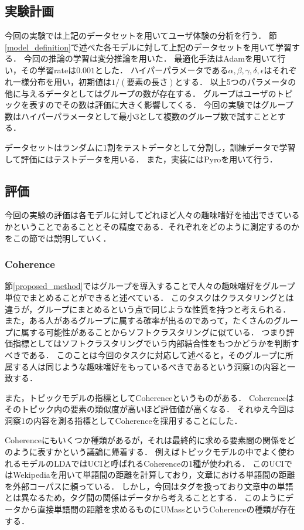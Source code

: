 \documentclass[a4j,10pt, twocolumn]{jarticle}
\begin{document}
\subsection{実験計画} \label{experimental-setting}
今回の実験では上記のデータセットを用いてユーザ体験の分析を行う．
節\ref{model_definition}で述べた各モデルに対して上記のデータセットを用いて学習する．
今回の推論の学習は変分推論を用いた．
最適化手法はAdam\cite{kingma2014adam}を用いて行い，その学習rateは$0.001$とした．
ハイパーパラメータである$\alpha, \beta, \gamma, \delta, \epsilon$はそれぞれ一様分布を用い，初期値は$1/(要素の長さ)$とする．
以上5つのパラメータの他に与えるデータとしてはグループの数が存在する．
グループはユーザのトピックを表すのでその数は評価に大きく影響してくる．
今回の実験ではグループ数はハイパーパラメータとして最小3として複数のグループ数で試すこととする．

データセットはランダムに1割をテストデータとして分割し，訓練データで学習して評価にはテストデータを用いる．
また，実装にはPyroを用いて行う．

\subsection{評価} \label{evaluation}
今回の実験の評価は各モデルに対してどれほど人々の趣味嗜好を抽出できているかということであることとその精度である．それぞれをどのように測定するのかをこの節では説明していく．

\subsubsection{Coherence} \label{coherence}
節\ref{proposed_method}ではグループを導入することで人々の趣味嗜好をグループ単位でまとめることができると述べている．
このタスクはクラスタリングとは違うが，グループにまとめるという点で同じような性質を持つと考えられる．
また，ある人があるグループに属する確率が出るのであって，たくさんのグループに属する可能性があることからソフトクラスタリングに似ている．
つまり評価指標としてはソフトクラスタリングでいう内部結合性をもつかどうかを判断すべきである．
このことは今回のタスクに対応して述べると，そのグループに所属する人は同じような趣味嗜好をもっているべきであるという洞察1の内容と一致する．

また，トピックモデルの指標としてCoherence\cite{first-coherence}というものがある．
Coherenceはそのトピック内の要素の類似度が高いほど評価値が高くなる．
それゆえ今回は洞察1の内容を測る指標としてCoherenceを採用することにした．

Coherenceにもいくつか種類があるが，それは最終的に求める要素間の関係をどのように表すかという議論に帰着する．
例えばトピックモデルの中でよく使われるモデルのLDA\cite{blei2003latent}ではUCI\cite{newman2010automatic}と呼ばれるCoherenceの1種が使われる．
このUCIではWekipediaを用いて単語間の距離を計算しており，文章における単語間の距離を外部コーパスに頼っている．
しかし，今回はタグを扱っており文章中の単語とは異なるため，タグ間の関係はデータから考えることとする．
このようにデータから直接単語間の距離を求めるものにUMass\cite{mimno2011optimizing}というCoherenceの種類が存在する．
\end{document}
